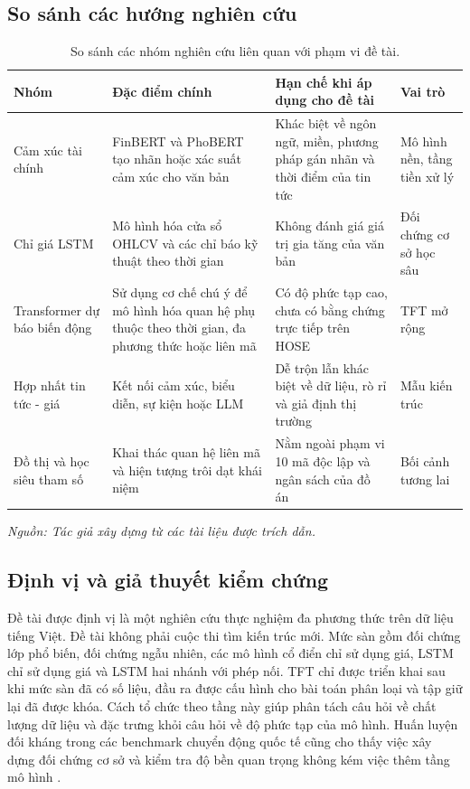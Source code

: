 \documentclass[12pt, a4paper, oneside]{report}
\begin{document}
\subsection{So sánh các hướng nghiên cứu}

\begin{table}[H]
  \centering
  \caption{So sánh các nhóm nghiên cứu liên quan với phạm vi đề tài.}
  \label{tab:tq-so-sanh}
  \begin{tabular}{p{3.0cm} p{4.1cm} p{4.1cm} p{2.6cm}}
    \toprule
    Nhóm & Đặc điểm chính & Hạn chế khi áp dụng cho đề tài & Vai trò \\
    \midrule
    Cảm xúc tài chính & FinBERT và PhoBERT tạo nhãn hoặc xác suất cảm xúc cho văn bản
    \cite{Yang2020_200608097v2,Nguyen2020_200300744v3} & Khác biệt về ngôn ngữ, miền,
    phương pháp gán nhãn và thời điểm của tin tức & Mô hình nền, tầng tiền xử lý \\
    Chỉ giá LSTM & Mô hình hóa cửa sổ OHLCV và các chỉ báo kỹ thuật theo thời gian
\cite{Halder2022_221107392v1} & Không đánh giá giá trị gia tăng của văn bản & Đối chứng cơ sở học sâu \\
    Transformer dự báo biến động & Sử dụng cơ chế chú ý để mô hình hóa quan hệ phụ thuộc theo thời gian, đa phương thức hoặc
    liên mã \cite{Boyle2023_230503835v1,Omranpour2024_241210540v1} & Có độ phức tạp cao,
    chưa có bằng chứng trực tiếp trên HOSE & TFT mở rộng \\
    Hợp nhất tin tức - giá & Kết nối cảm xúc, biểu diễn, sự kiện hoặc LLM
    \cite{Chen2021_210708721v1,Elahi2024_241101368v1} & Dễ trộn lẫn khác biệt về dữ liệu,
    rò rỉ và giả định thị trường & Mẫu kiến trúc \\
    Đồ thị và học siêu tham số & Khai thác quan hệ liên mã và hiện tượng trôi dạt khái niệm
    \cite{Xu2021_211013716v2,Zhao2023_230609862v3} & Nằm ngoài phạm vi 10 mã độc lập và
    ngân sách của đồ án & Bối cảnh tương lai \\
    \bottomrule
  \end{tabular}
\noindent\textit{Nguồn: Tác giả xây dựng từ các tài liệu được trích dẫn.}
\end{table}

\subsection{Định vị và giả thuyết kiểm chứng}

Đề tài được định vị là một nghiên cứu thực nghiệm đa phương thức trên dữ liệu tiếng
Việt. Đề tài không phải cuộc thi tìm kiến trúc mới. Mức sàn gồm đối chứng lớp phổ biến, đối chứng ngẫu nhiên, các mô hình
cổ điển chỉ sử dụng giá, LSTM chỉ sử dụng giá và LSTM hai nhánh với phép nối. TFT chỉ được triển khai sau khi
mức sàn đã có số liệu, đầu ra được cấu hình cho bài toán phân loại và tập giữ lại đã được khóa. Cách
tổ chức theo tầng này giúp phân tách câu hỏi về chất lượng dữ liệu và đặc trưng khỏi câu hỏi về độ
phức tạp của mô hình. Huấn luyện đối kháng trong các benchmark chuyển động quốc tế cũng cho thấy việc xây dựng đối chứng cơ sở và kiểm tra độ bền quan trọng không kém việc thêm tầng mô hình \cite{Feng2018_181009936v2}.
\end{document}
